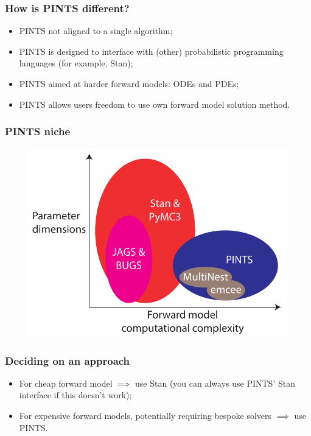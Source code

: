 \documentclass[handout]{beamer}
\begin{document}
\begin{frame}
	\frametitle{How is PINTS different?}
	\begin{itemize}
		\item PINTS not aligned to a single algorithm;
		\item PINTS is designed to interface with (other) probabilistic programming languages (for example, Stan);
		\item PINTS aimed at harder forward models: ODEs and PDEs;
		\item PINTS allows users freedom to use own forward model solution method.
	\end{itemize}
\end{frame}

\begin{frame}
	\frametitle{PINTS niche}
	
	\begin{figure}
		\centerline{\includegraphics[width=1\textwidth]{./Figures/niche-samplers.pdf}}
	\end{figure}
	
\end{frame}

\begin{frame}
	\frametitle{Deciding on an approach}
	
	\begin{itemize}
		\item For cheap forward model $\implies$ use Stan (you can always use PINTS' Stan interface if this doesn't work);
		\item For expensive forward models, potentially requiring bespoke solvers $\implies$ use PINTS.
	\end{itemize}
	
\end{frame}
\end{document}
